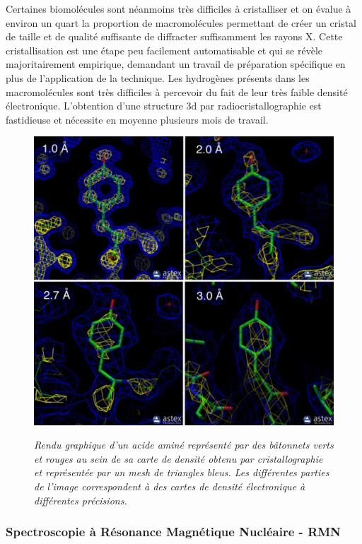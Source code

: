 Certaines biomolécules sont néanmoins très difficiles à cristalliser et on évalue à environ un quart la proportion de macromolécules permettant de créer un cristal de taille et de qualité suffisante de diffracter suffisamment les rayons X. Cette cristallisation est une étape peu facilement automatisable et qui se révèle majoritairement empirique, demandant un travail de préparation spécifique en plus de l'application de la technique. Les hydrogènes présents dans les macromolécules sont très difficiles à percevoir du fait de leur très faible densité électronique. L'obtention d'une structure 3d par radiocristallographie est fastidieuse et nécessite en moyenne plusieurs mois de travail.

\begin{figure}[h]
  \centering
  {\includegraphics[width=0.5\linewidth]{./figures/ch1/resolution_xray.pdf}}
    \caption{\it Rendu graphique d'un acide aminé représenté par des bâtonnets verts et rouges au sein de sa carte de densité obtenu par cristallographie et représentée par un mesh de triangles bleus. Les différentes parties de l'image correspondent à des cartes de densité électronique à différentes précisions.}
    \label{Fig:resolution_xray}
  \hspace{0.2cm}
\end{figure}

\subsubsection{Spectroscopie à Résonance Magnétique Nucléaire - RMN}

